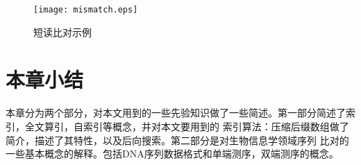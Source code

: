 \begin{figure}[htbp]
    \centering
    \texttt{[image: mismatch.eps]}
    \caption{短读比对示例} \label{fig:mismatch}
\end{figure}

\section{本章小结}
本章分为两个部分，对本文用到的一些先验知识做了一些简述。第一部分简述了索引，全文算引，自索引等概念，并对本文要用到的
索引算法：压缩后缀数组做了简介，描述了其特性，以及后向搜索。第二部分是对生物信息学领域序列
比对的一些基本概念的解释。包括DNA序列数据格式和单端测序，双端测序的概念。
